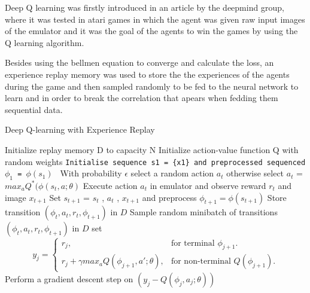 \documentclass[12pt]{article}
\begin{document}
Deep Q learning was firstly introduced in an article by the deepmind group, where it was tested in atari games in which the agent was given raw input images of the emulator and it was the  goal of the agents to win the games by using the Q learning algorithm.

Besides using the bellmen equation to converge and calculate the loss, an experience replay memory was used to store the the experiences of the agents during  the game and then sampled randomly to be  fed to the neural network to learn and in order to break the correlation that apears when fedding them sequential data.\cite{mnih2013playing}
 
\begin{algorithm}
\caption{Deep Q-learning with Experience Replay}\label{alg:cap}
\begin{algorithmic}
\State Initialize replay memory D to capacity N
\State Initialize action-value function Q with random weights
        \State \texttt{Initialise sequence s1 = \{x1\} and preprocessed sequenced $\phi_{1}$ = $\phi(s_{1})$  }
         \State With probability $\epsilon$ select a random action $a_{t}$
         \State otherwise select  $a_{t}$ = $max_{a} Q^{*}(\phi(s_{t},a;\theta) $ 
         \State Execute action $a_{t}$ in emulator and observe reward ${r_{t}}$ and image $x_{t+1}$
        \State Set $s_{t+1}$ = $s_{t}$ , $a_{t}$ , $x_{t+1}$ and preprocess  
        $\phi_{t+1}=\phi(s_{t+1})$
        \State Store transition $(\phi_{t} , a_{t} , r_{t} , \phi_{t+1} )$ in $D$
        \State Sample random
minibatch of transitions $(\phi_{t} , a_{t} , r_{t} , \phi_{t+1} )$ in $D$
        \State set  \begin{equation}
  y_{j}=\begin{cases}
    r_{j}, & \text{for terminal $\phi_{j+1} $}.\\
    r_{j}+\gamma max_{a}Q(\phi_{j+1},a';\theta) , & \text{for non-terminal $Q(\phi_{j+1})$}.
  \end{cases}
\end{equation}
        \State Perform a gradient descent step on $(y_{j} - Q(\phi_{j} , a_{j} ; \theta))$ 
        \EndFor 
\EndFor 


\end{algorithmic}
\end{algorithm}
 

 

 

 
\end{document}
